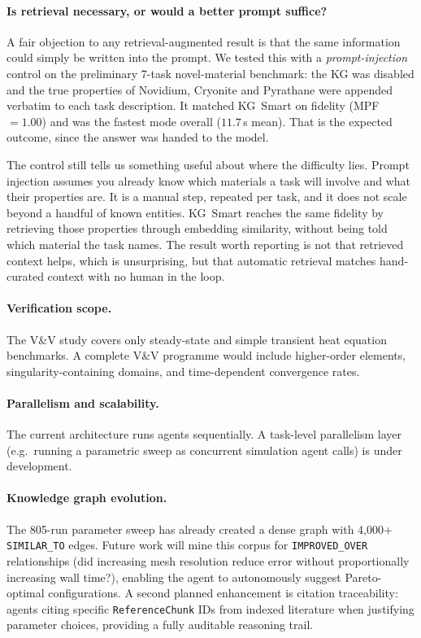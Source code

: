 \documentclass[twocolumn]{article}
\newif\ifrevisionsvisible
\newcommand{\revised}[1]{%
  \ifrevisionsvisible\textcolor{revisionred}{#1}\else#1\fi}
\begin{document}
\revised{\paragraph{Is retrieval necessary, or would a better prompt suffice?}
A fair objection to any retrieval-augmented result is that the same
information could simply be written into the prompt.  We tested this with
a \emph{prompt-injection} control on the preliminary 7-task
novel-material benchmark: the KG was disabled and the true properties of
Novidium, Cryonite and Pyrathane were appended verbatim to each task
description.  It matched KG~Smart on fidelity (MPF~$=1.00$) and was the
fastest mode overall ($11.7$\,s mean).  That is the expected outcome,
since the answer was handed to the model.}

\revised{The control still tells us something useful about where the
difficulty lies.  Prompt injection assumes you already know which
materials a task will involve and what their properties are.  It is a
manual step, repeated per task, and it does not scale beyond a handful of
known entities.  KG~Smart reaches the same fidelity by retrieving those
properties through embedding similarity, without being told which
material the task names.  The result worth reporting is not that
retrieved context helps, which is unsurprising, but that automatic
retrieval matches hand-curated context with no human in the loop.}

\paragraph{Verification scope.}
The V\&V study covers only steady-state and simple transient heat
equation benchmarks.  A complete V\&V programme would include
higher-order elements, singularity-containing domains, and
time-dependent convergence rates.

\paragraph{Parallelism and scalability.}
The current architecture runs agents sequentially.  A task-level
parallelism layer (e.g.\ running a parametric sweep as concurrent
simulation agent calls) is under development.

\paragraph{Knowledge graph evolution.}
The 805-run parameter sweep has already created a dense graph with
4{,}000+ \texttt{SIMILAR\_TO} edges.  Future work will mine this corpus
for \texttt{IMPROVED\_OVER} relationships (did increasing mesh resolution
reduce error without proportionally increasing wall time?), enabling the
agent to autonomously suggest Pareto-optimal configurations.  A second
planned enhancement is citation traceability: agents citing specific
\texttt{ReferenceChunk} IDs from indexed literature when justifying
parameter choices, providing a fully auditable reasoning trail.
\end{document}
